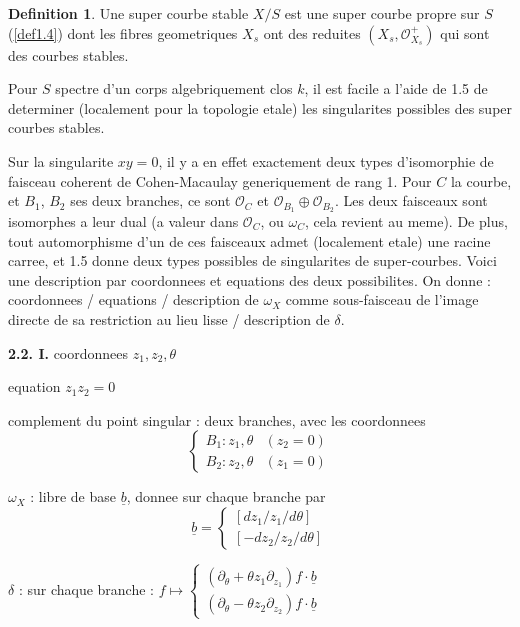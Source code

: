 \documentclass[11pt,a4paper]{article}
\theoremstyle{plain}
\theoremstyle{definition}
\newtheorem{definition}[theorem]{Definition}
\begin{document}
\begin{definition}\label{def2.1}
Une super courbe stable $X/S$ est une super courbe propre sur $S$ (\ref{def1.4}) dont les fibres geometriques $X_s$ ont des reduites $(X_s, \mathcal{O}_{X_s}^+)$ qui sont des courbes stables.
\end{definition}

Pour $S$ spectre d'un corps algebriquement clos $k$, il est facile a l'aide de 1.5 de determiner (localement pour la topologie etale) les singularites possibles des super courbes stables.

Sur la singularite $xy = 0$, il y a en effet exactement deux types d'isomorphie de faisceau coherent de Cohen-Macaulay generiquement de rang 1. Pour $C$ la courbe, et $B_1$, $B_2$ ses deux branches, ce sont $\mathcal{O}_C$ et $\mathcal{O}_{B_1} \oplus \mathcal{O}_{B_2}$. Les deux faisceaux sont isomorphes a leur dual (a valeur dans $\mathcal{O}_C$, ou $\omega_C$, cela revient au meme). De plus, tout automorphisme d'un de ces faisceaux admet (localement etale) une racine carree, et 1.5 donne deux types possibles de singularites de super-courbes. Voici une description par coordonnees et equations des deux possibilites. On donne : coordonnees / equations / description de $\omega_X$ comme sous-faisceau de l'image directe de sa restriction au lieu lisse / description de $\delta$.

\medskip

\noindent \textbf{2.2. I.} coordonnees $z_1, z_2, \theta$

equation $z_1 z_2 = 0$

complement du point singular : deux branches, avec les coordonnees
\[
\begin{cases} B_1 : z_1, \theta & (z_2 = 0) \\ B_2 : z_2, \theta & (z_1 = 0) \end{cases}
\]

$\omega_X$ : libre de base $\underline{b}$, donnee sur chaque branche par
\[
\underline{b} = \begin{cases} [dz_1/z_1 / d\theta] \\ [-dz_2/z_2 / d\theta] \end{cases}
\]

$\delta$ : sur chaque branche : $f \mapsto \begin{cases} (\partial_\theta + \theta z_1\partial_{z_1})f \cdot \underline{b} \\ (\partial_\theta - \theta z_2\partial_{z_2})f \cdot \underline{b} \end{cases}$
\end{document}
